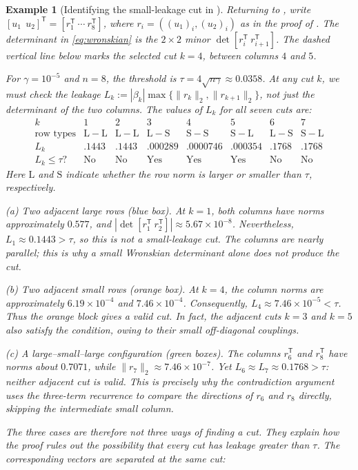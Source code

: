 \documentclass[10pt,a4paper]{article}
\newtheorem{example}{Example}[section]
\begin{document}
\begin{example}[Identifying the small-leakage cut in ]
\label{rem:localization-example}
Returning to , write
$[u_1\ \ u_2]^{\mathsf T}=[r_1^{\mathsf T}\ \cdots\ r_8^{\mathsf T}]$,
where $r_i=((u_1)_i,(u_2)_i)$ as in the proof of .
The determinant in \eqref{eq:wronskian} is the $2\times2$ minor
$\det[r_i^{\mathsf T}\ r_{i+1}^{\mathsf T}]$. The dashed vertical line below
marks the selected cut $k=4$, between columns $4$ and $5$.

For $\gamma=10^{-5}$ and $n=8$, the threshold is
$\tau=4\sqrt{n\gamma}\approx0.0358$. At any cut $k$,
we must check the \emph{leakage}
$L_k:=|\beta_k|\max\{\|r_k\|_2,\|r_{k+1}\|_2\}$,
not just the determinant of the two columns. The values of $L_k$ for all seven cuts are:
\[
\begin{array}{c|ccccccc}
 k&1&2&3&4&5&6&7\\ \hline
 \text{row types}&\mathrm{L-L}&\mathrm{L-L}&\mathrm{L-S}&\mathrm{S-S}&\mathrm{S-L}&\mathrm{L-S}&\mathrm{S-L}\\
 L_k&.1443&.1443&.000289&.0000746&.000354&.1768&.1768\\
 L_k\leq\tau?&\text{No}&\text{No}&\text{Yes}&\text{Yes}&\text{Yes}&\text{No}&\text{No}
\end{array}
\]
Here $\mathrm{L}$ and $\mathrm{S}$ indicate whether the row norm is
larger or smaller than $\tau$, respectively.

\emph{(a) Two adjacent large rows (blue box).}
At $k=1$, both columns have norms approximately $0.577$,
and $|\det[r_1^{\mathsf T}\ r_2^{\mathsf T}]|\approx5.67\times10^{-8}$.
Nevertheless, $L_1\approx0.1443>\tau$, so this is \emph{not}
a small-leakage cut. The columns are nearly parallel; this is
why a small Wronskian determinant alone does not produce the cut.

\emph{(b) Two adjacent small rows (orange box).}
At $k=4$, the column norms are approximately
$6.19\times10^{-4}$ and $7.46\times10^{-4}$.
Consequently, $L_4\approx7.46\times10^{-5}<\tau$.
Thus \emph{the orange block gives a valid cut}.
In fact, the adjacent cuts $k=3$ and $k=5$ also satisfy the
condition, owing to their small off-diagonal couplings.

\emph{(c) A large--small--large configuration (green boxes).}
The columns $r_6^{\mathsf T}$ and $r_8^{\mathsf T}$ have norms about $0.7071$,
while $\|r_7\|_2\approx7.46\times10^{-7}$.
Yet $L_6\approx L_7\approx0.1768>\tau$: neither adjacent
cut is valid. This is precisely why the contradiction argument
uses the three-term recurrence to compare the directions
of $r_6$ and $r_8$ directly, skipping the
intermediate small column.

The three cases are therefore not three ways of finding a cut.
They explain how the proof rules out the possibility that
\emph{every} cut has leakage greater than $\tau$.
The corresponding vectors are separated at the same cut:

\end{example}
\end{document}
